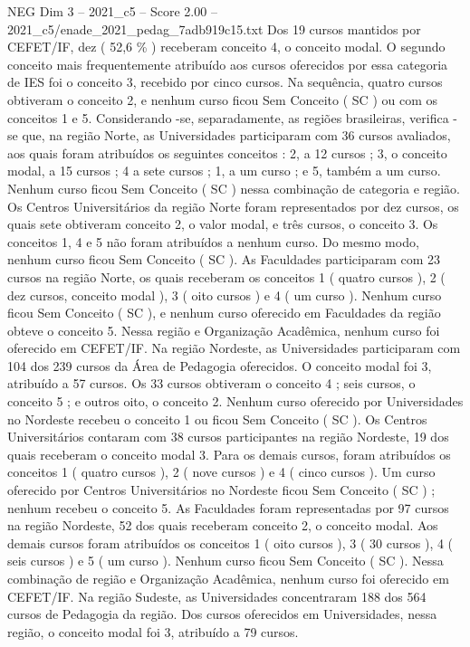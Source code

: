 \begin{textsample}{NEG Dim 3 – 2021\_c5 – Score 2.00 – 2021\_c5/enade\_2021\_pedag\_7adb919c15.txt}
Dos 19 cursos mantidos por CEFET/IF, dez ( 52,6 \% ) receberam conceito 4, o conceito modal.
O segundo conceito mais frequentemente atribuído aos cursos oferecidos por essa categoria de IES foi o conceito 3, recebido por cinco cursos.
Na sequência, quatro cursos obtiveram o conceito 2, e nenhum curso ficou Sem Conceito ( SC ) ou com os conceitos 1 e 5.
Considerando -se, separadamente, as regiões brasileiras, verifica -se que, na região Norte, as Universidades participaram com 36 cursos avaliados, aos quais foram atribuídos os seguintes conceitos : 2, a 12 cursos ; 3, o conceito modal, a 15 cursos ; 4 a sete cursos ; 1, a um curso ; e 5, também a um curso.
Nenhum curso ficou Sem Conceito ( SC ) nessa combinação de categoria e região.
Os Centros Universitários da região Norte foram representados por dez cursos, os quais sete obtiveram conceito 2, o valor modal, e três cursos, o conceito 3.
Os conceitos 1, 4 e 5 não foram atribuídos a nenhum curso.
Do mesmo modo, nenhum curso ficou Sem Conceito ( SC ).
As Faculdades participaram com 23 cursos na região Norte, os quais receberam os conceitos 1 ( quatro cursos ), 2 ( dez cursos, conceito modal ), 3 ( oito cursos ) e 4 ( um curso ).
Nenhum curso ficou Sem Conceito ( SC ), e nenhum curso oferecido em Faculdades da região obteve o conceito 5.
Nessa região e Organização Acadêmica, nenhum curso foi oferecido em CEFET/IF.
Na região Nordeste, as Universidades participaram com 104 dos 239 cursos da Área de Pedagogia oferecidos.
O conceito modal foi 3, atribuído a 57 cursos.
Os 33 cursos obtiveram o conceito 4 ; seis cursos, o conceito 5 ; e outros oito, o conceito 2.
Nenhum curso oferecido por Universidades no Nordeste recebeu o conceito 1 ou ficou Sem Conceito ( SC ).
Os Centros Universitários contaram com 38 cursos participantes na região Nordeste, 19 dos quais receberam o conceito modal 3.
Para os demais cursos, foram atribuídos os conceitos 1 ( quatro cursos ), 2 ( nove cursos ) e 4 ( cinco cursos ).
Um curso oferecido por Centros Universitários no Nordeste ficou Sem Conceito ( SC ) ; nenhum recebeu o conceito 5.
As Faculdades foram representadas por 97 cursos na região Nordeste, 52 dos quais receberam conceito 2, o conceito modal.
Aos demais cursos foram atribuídos os conceitos 1 ( oito cursos ), 3 ( 30 cursos ), 4 ( seis cursos ) e 5 ( um curso ).
Nenhum curso ficou Sem Conceito ( SC ).
Nessa combinação de região e Organização Acadêmica, nenhum curso foi oferecido em CEFET/IF.
Na região Sudeste, as Universidades concentraram 188 dos 564 cursos de Pedagogia da região.
Dos cursos oferecidos em Universidades, nessa região, o conceito modal foi 3, atribuído a 79 cursos.

\end{textsample}
